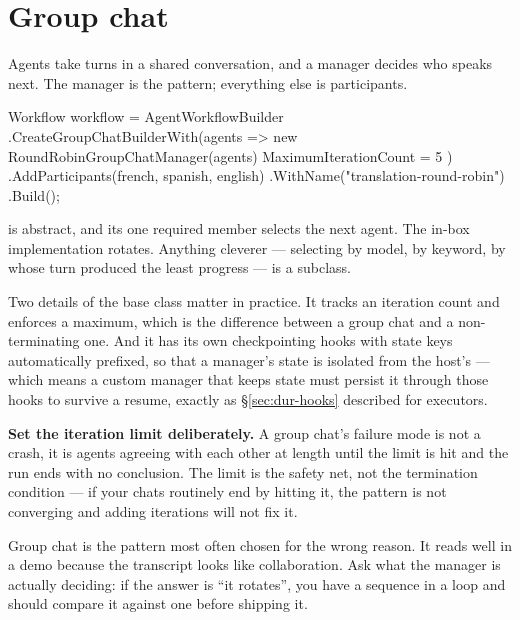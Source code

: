\section{Group chat}
\label{sec:orch-groupchat}

Agents take turns in a shared conversation, and a manager decides who speaks
next. The manager is the pattern; everything else is participants.

\begin{csharp}[caption={Round-robin turn taking}, label={lst:orch-groupchat}]
Workflow workflow = AgentWorkflowBuilder
    .CreateGroupChatBuilderWith(agents =>
        new RoundRobinGroupChatManager(agents) { MaximumIterationCount = 5 })
    .AddParticipants(french, spanish, english)
    .WithName("translation-round-robin")
    .Build();
\end{csharp}

 is abstract, and its one required member selects the next
agent. The in-box implementation rotates. Anything cleverer --- selecting by
model, by keyword, by whose turn produced the least progress --- is a subclass.

Two details of the base class matter in practice. It tracks an iteration count
and enforces a maximum, which is the difference between a group chat and a
non-terminating one. And it has its own checkpointing hooks with state keys
automatically prefixed, so that a manager's state is isolated from the host's ---
which means a custom manager that keeps state must persist it through those hooks
to survive a resume, exactly as \S\ref{sec:dur-hooks} described for executors.

\begin{warning}
\textbf{Set the iteration limit deliberately.} A group chat's failure mode is not
a crash, it is agents agreeing with each other at length until the limit is hit
and the run ends with no conclusion. The limit is the safety net, not the
termination condition --- if your chats routinely end by hitting it, the pattern
is not converging and adding iterations will not fix it.
\end{warning}

\begin{note}
Group chat is the pattern most often chosen for the wrong reason. It reads well in
a demo because the transcript looks like collaboration. Ask what the manager is
actually deciding: if the answer is ``it rotates'', you have a sequence in a loop
and should compare it against one before shipping it.
\end{note}

